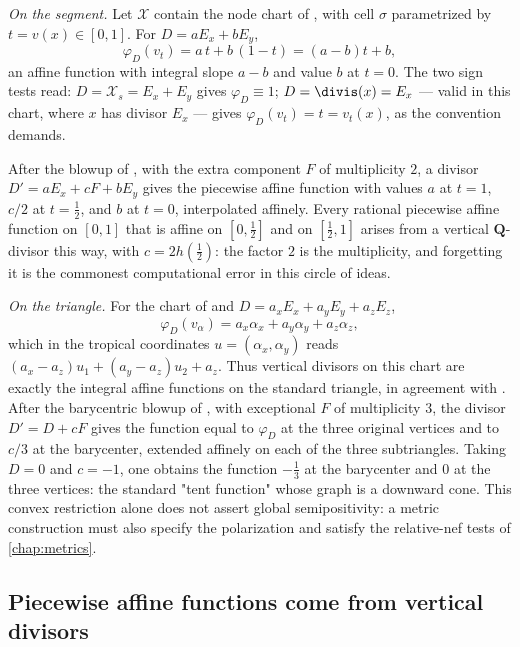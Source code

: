 \begin{example}
\label{ex:model-functions-computed}
\emph{On the segment.} Let $\mathcal X$ contain the node chart of
, with cell $\sigma$ parametrized by
$t=v(x)\in[0,1]$. For $D=aE_x+bE_y$,
\[
 \varphi_D(v_t)=a\,t+b\,(1-t)=(a-b)t+b,
\]
an affine function with integral slope $a-b$ and value $b$ at $t=0$.
The two sign tests read: $D=\mathcal X_s=E_x+E_y$ gives
$\varphi_D\equiv1$; $D=\divis(x)=E_x$ --- valid in this chart, where
$x$ has divisor $E_x$ --- gives $\varphi_D(v_t)=t=v_t(x)$, as the
convention demands.

After the blowup of , with the extra component
$F$ of multiplicity $2$, a divisor $D'=aE_x+cF+bE_y$ gives the
piecewise affine function with values $a$ at $t=1$, $c/2$ at
$t=\tfrac12$, and $b$ at $t=0$, interpolated affinely. Every
rational piecewise affine function on $[0,1]$ that is affine on
$[0,\tfrac12]$ and on $[\tfrac12,1]$ arises from a vertical
$\mathbf Q$-divisor this way, with $c=2h(\tfrac12)$: the factor $2$
is the multiplicity, and forgetting it is the commonest computational error
in this circle of ideas.

\emph{On the triangle.} For the chart of  and
$D=a_xE_x+a_yE_y+a_zE_z$,
\[
 \varphi_D(v_\alpha)=a_x\alpha_x+a_y\alpha_y+a_z\alpha_z,
\]
which in the tropical coordinates $u=(\alpha_x,\alpha_y)$ reads
$(a_x-a_z)u_1+(a_y-a_z)u_2+a_z$. Thus vertical divisors on this chart are
exactly the integral affine functions on the standard triangle, in
agreement with . After the barycentric
blowup of , with exceptional $F$ of
multiplicity $3$, the divisor $D'=D+cF$ gives the function equal to
$\varphi_D$ at the three original vertices and to $c/3$ at the
barycenter, extended affinely on each of the three subtriangles. Taking
$D=0$ and $c=-1$, one obtains the function $-\tfrac13$ at the
barycenter and $0$ at the three vertices: the standard "tent function"
whose graph is a downward cone. This convex restriction alone does not
assert global semipositivity: a metric construction must also specify the
polarization and satisfy the relative-nef tests of \cref{chap:metrics}.
\end{example}

\subsection{Piecewise affine functions come from vertical divisors}

